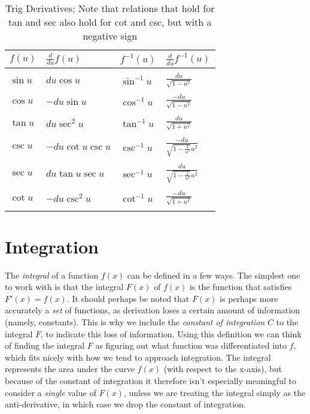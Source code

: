 \documentclass[letterpaper,normalheadings,twocolumn]{scrreprt}
\begin{document}
\begin{table}[ht]
  \centering
  \begin{tabular}{|l|l||l|l|}
  \hline
  $f(u)$ & $\frac{d}{du}f(u)$ & $f^{-1}(u)$ & $\frac{d}{du}f^{-1}(u)$ \\  
  \hline
  & & & \\ $\sin{u}$ & $du\cos{u}$ & $\sin^{-1}{u}$ & $\frac{du}{\sqrt{1 - u^2}}$\\
  & & & \\ $\cos{u}$ & $-du\sin{u}$ & $\cos^{-1}{u}$ & $\frac{-du}{\sqrt{1 - u^2}}$\\
  & & & \\ $\tan{u}$ & $du\sec^2{u}$ & $\tan^{-1}{u}$ & $\frac{du}{\sqrt{1 + u^2}}$\\
  & & & \\ $\csc{u}$ & $-du\cot{u}\csc{u}$ & $\csc^{-1}{u}$ & $\frac{-du}{\sqrt{1-\frac{1}{u^2}} u^2}$\\
  & & & \\ $\sec{u}$ & $du\tan{u}\sec{u}$ & $\sec^{-1}{u}$ & $\frac{du}{\sqrt{1-\frac{1}{u^2}} u^2}$\\
  & & & \\ $\cot{u}$ & $-du\csc^2{u}$ & $\cot^{-1}{u}$ & $\frac{-du}{\sqrt{1 + u^2}}$\\ 
  & & & \\
  \hline
  \end{tabular}
  \caption{Trig Derivatives; Note that relations that hold for tan and sec also hold for cot and csc, but with a negative sign}
  \label{tab:results}
\end{table}



\chapter{Integration}
The \emph{integral} of a function $f(x)$ can be defined in a few ways. The simplest one to work with is that the integral $F(x)$ of $f(x)$ is the function that satisfies $F'(x) = f(x)$. It should perhaps be noted that $F(x)$ is perhaps more accurately a \emph{set} of functions, as derivation loses a certain amount of information (namely, constants). This is why we include the \emph{constant of integration} $C$ to the integral $F$, to indicate this loss of information. Using this definition we can think of finding the integral $F$ as figuring out what function was differentiated into $f$, which fits nicely with how we tend to approach integration. The integral represents the area under the curve $f(x)$ (with respect to the x-axis), but because of the constant of integration it therefore isn't especially meaningful to consider a \emph{single} value of $F(x)$, unless we are treating the integral simply as the anti-derivative, in which case we drop the constant of integration.
\end{document}
